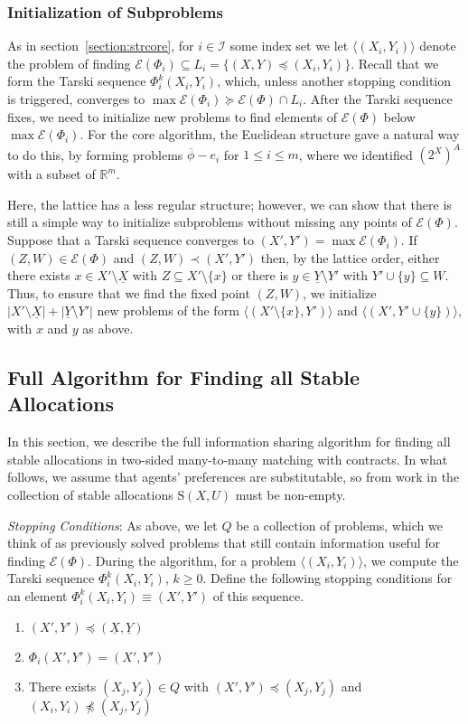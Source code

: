 \documentclass[11pt,reqno]{amsart}
\theoremstyle{definition}
\numberwithin{equation}{section}
\newcommand{\mr}{\mathbb{R}}
\newcommand{\ol}{\overline}
\newcommand{\ul}{\underline}
\newcommand{\lag}{\langle}
\newcommand{\rag}{\rangle}
\newcommand{\pre}{\phi}
\newcommand{\prealloc}{(2^X)^A}
\newcommand{\sub}{\subseteq}
\newcommand{\stable}{\mathrm{S}(X,U)}
\newcommand{\fix}{\mathcal{E}}
\newcommand{\suq}{\succeq}
\newcommand{\peq}{\preceq}
\newcommand{\pe}{\prec}
\newcommand{\toppre}{\ol{\pre}}
\newcommand{\act}{Q}
\newcommand{\lattice}{L}
\newcommand{\botx}{\ul{X}}
\newcommand{\boty}{\ul{Y}}
\begin{document}
\subsubsection{Initialization of Subproblems}
As in section~\ref{section:strcore}, for $i \in \mathcal{I}$ some index set we let $\lag (X_i, Y_i) \rag$ denote the problem of finding $\fix(\Phi_i) \sub \lattice_i = \{(X,Y) \peq (X_i, Y_i) \}$.
Recall that we form the Tarski sequence $\Phi_i^k(X_i,Y_i)$, which, unless another stopping condition is triggered, converges to $\max \fix(\Phi_i) \suq \fix(\Phi) \cap \lattice_i$.
After the Tarski sequence fixes, we need to initialize new problems to find elements of $\fix(\Phi)$ below $\max \fix(\Phi_i)$.
For the core algorithm, the Euclidean structure gave a natural way to do this, by forming problems $\toppre - e_i$ for $1 \leq i \leq m$, where we identified $\prealloc$ with a subset of $\mr^m$. 

Here, the lattice has a less regular structure; however, we can show that there is still a simple way to initialize subproblems without missing any points of $\fix(\Phi)$.
Suppose that a Tarski sequence converges to $(X',Y') = \max \fix(\Phi_i)$.
If $(Z,W) \in \fix(\Phi)$ and $(Z,W) \pe (X',Y')$ then, by the lattice order, either there exists $x \in X' \setminus \botx$ with $Z \sub X' \setminus \{x\}$ or there is $y \in \boty \setminus Y'$ with $Y' \cup \{y\} \sub W$.
Thus, to ensure that we find the fixed point $(Z,W)$, we initialize $|X' \setminus \botx| + |\boty \setminus Y'|$ new problems of the form $\lag (X' \setminus \{x\},Y') \rag$ and $\lag (X',Y' \cup \{y\}) \rag$, with $x$ and $y$ as above.

\subsection{Full Algorithm for Finding all Stable Allocations} \label{section:algostable}

In this section, we describe the full information sharing algorithm for finding all stable allocations in two-sided many-to-many matching with contracts.
In what follows, we assume that agents' preferences are substitutable, so from work in \cite{HatfieldMilgrom2005} the collection of stable allocations $\stable$ must be non-empty. 


\emph{Stopping Conditions}:
As above, we let $\act$ be a collection of problems, which we think of as previously solved problems that still contain information useful for finding $\fix(\Phi)$. 
During the algorithm, for a problem $\lag (X_i, Y_i) \rag $, we compute the Tarski sequence $\Phi_i^k(X_i,Y_i)$, $k \geq 0$. 
Define the following stopping conditions for an element $ \Phi_i^k(X_i,Y_i) \equiv (X', Y')$ of this sequence.
\begin{enumerate}
\item $(X',Y') \peq (\botx, \boty)$ \label{cond:bottom}
\item $\Phi_i(X',Y') = (X',Y')$ \label{cond:fix}
\item There exists $(X_j,Y_j) \in \act$ with $(X',Y') \peq (X_j,Y_j)$ and $(X_i,Y_i) \not \peq (X_j,Y_j)$ \label{cond:collide}
\end{enumerate}
\end{document}
